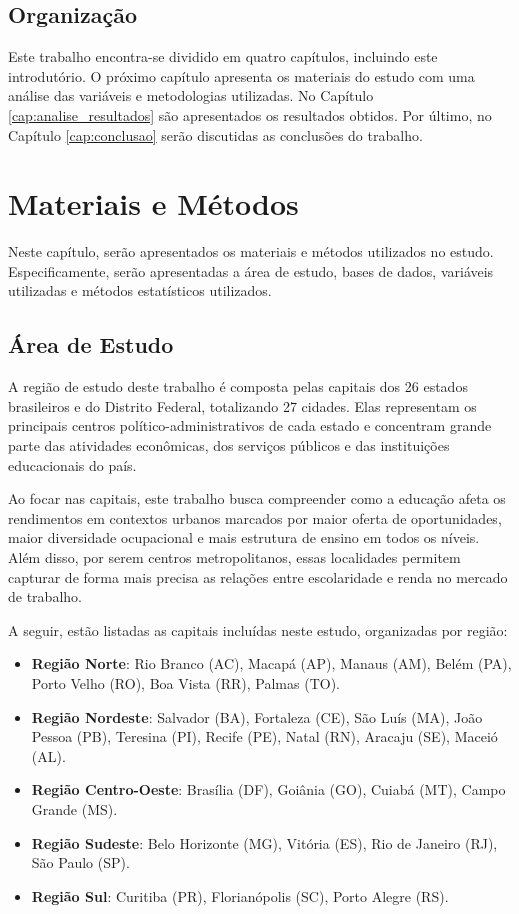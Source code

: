 \documentclass[12pt,a4paper,header]{abnt}
\begin{document}
\section{Organização}
Este trabalho encontra-se dividido em quatro capítulos, incluindo este introdutório. O próximo capítulo apresenta os materiais do estudo com uma análise das variáveis e metodologias utilizadas. No Capítulo \ref{cap:analise_resultados} são apresentados os resultados obtidos. Por último, no Capítulo \ref{cap:conclusao} serão discutidas as conclusões do trabalho.





\chapter{Materiais e Métodos} \label{cap:materias_metodos}

Neste capítulo, serão apresentados os materiais e métodos utilizados no estudo. Especificamente, serão apresentadas a área de estudo, bases de dados, variáveis utilizadas e métodos estatísticos utilizados.


\section{Área de Estudo}
A região de estudo deste trabalho é composta pelas capitais dos 26 estados brasileiros e do Distrito Federal, totalizando 27 cidades. Elas representam os principais centros político-administrativos de cada estado e concentram grande parte das atividades econômicas, dos serviços públicos e das instituições educacionais do país.

Ao focar nas capitais, este trabalho busca compreender como a educação afeta os rendimentos em contextos urbanos marcados por maior oferta de oportunidades, maior diversidade ocupacional e mais estrutura de ensino em todos os níveis. Além disso, por serem centros metropolitanos, essas localidades permitem capturar de forma mais precisa as relações entre escolaridade e renda no mercado de trabalho.

A seguir, estão listadas as capitais incluídas neste estudo, organizadas por região:

\begin{itemize}
    \item \textbf{Região Norte}: Rio Branco (AC), Macapá (AP), Manaus (AM), Belém (PA), Porto Velho (RO), Boa Vista (RR), Palmas (TO).
    \item \textbf{Região Nordeste}: Salvador (BA), Fortaleza (CE), São Luís (MA), João Pessoa (PB), Teresina (PI), Recife (PE), Natal (RN), Aracaju (SE), Maceió (AL).
    \item \textbf{Região Centro-Oeste}: Brasília (DF), Goiânia (GO), Cuiabá (MT), Campo Grande (MS).
    \item \textbf{Região Sudeste}: Belo Horizonte (MG), Vitória (ES), Rio de Janeiro (RJ), São Paulo (SP).
    \item \textbf{Região Sul}: Curitiba (PR), Florianópolis (SC), Porto Alegre (RS).
\end{itemize}
\end{document}
